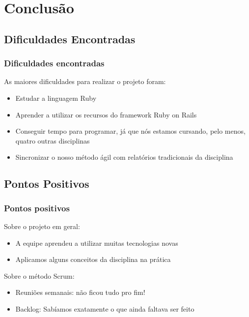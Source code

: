 \documentclass[11pt]{beamer}
\def\gap{\vspace{0.1in}}
\begin{document}
\section{Conclusão}

	\subsection{Dificuldades Encontradas}
	\begin{frame}
		\frametitle{Dificuldades encontradas}
		As maiores dificuldades para realizar o projeto foram:

		\gap
		\begin{itemize}
			\item Estudar a linguagem Ruby
			\item Aprender a utilizar os recursos do framework Ruby on Rails
			\item Conseguir tempo para programar, já que nós estamos cursando,
			pelo menos, quatro outras disciplinas
			\item Sincronizar o nosso método ágil com relatórios tradicionais da
			disciplina
		\end{itemize}	
	\end{frame}


	\subsection{Pontos Positivos}
	\begin{frame}
		\frametitle{Pontos positivos}
		Sobre o projeto em geral:
		\begin{itemize}
			\item A equipe aprendeu a utilizar muitas tecnologias novas
			\item Aplicamos alguns conceitos da disciplina na prática
		\end{itemize}	
		
		\gap
		Sobre o método Scrum:
		\begin{itemize}
			\item Reuniões semanais: não ficou tudo pro fim!
			\item Backlog: Sabíamos exatamente o que ainda faltava ser feito
		\end{itemize}
	\end{frame}
\end{document}
